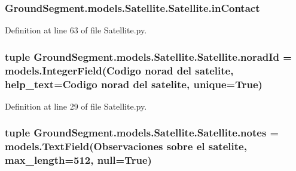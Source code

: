 \subsubsection[{in\+Contact}]{\setlength{\rightskip}{0pt plus 5cm}Ground\+Segment.\+models.\+Satellite.\+Satellite.\+in\+Contact}\label{class_ground_segment_1_1models_1_1_satellite_1_1_satellite_a5bb0cfae504099155343019582b87213}


Definition at line 63 of file Satellite.\+py.

\hypertarget{class_ground_segment_1_1models_1_1_satellite_1_1_satellite_a7962e5b81ff68f4fdedb33ce54bd4368}{}
\subsubsection[{norad\+Id}]{\setlength{\rightskip}{0pt plus 5cm}tuple Ground\+Segment.\+models.\+Satellite.\+Satellite.\+norad\+Id = models.\+Integer\+Field(\textquotesingle{}Codigo norad del satelite\textquotesingle{}, help\+\_\+text=\textquotesingle{}Codigo norad del satelite\textquotesingle{}, unique=True)\hspace{0.3cm}{\ttfamily [static]}}\label{class_ground_segment_1_1models_1_1_satellite_1_1_satellite_a7962e5b81ff68f4fdedb33ce54bd4368}


Definition at line 29 of file Satellite.\+py.

\hypertarget{class_ground_segment_1_1models_1_1_satellite_1_1_satellite_a6ae6b5fad6dd1a31200d8dd8e0ba07a0}{}
\subsubsection[{notes}]{\setlength{\rightskip}{0pt plus 5cm}tuple Ground\+Segment.\+models.\+Satellite.\+Satellite.\+notes = models.\+Text\+Field(\textquotesingle{}Observaciones sobre el satelite\textquotesingle{}, max\+\_\+length=512, null=True)\hspace{0.3cm}{\ttfamily [static]}}\label{class_ground_segment_1_1models_1_1_satellite_1_1_satellite_a6ae6b5fad6dd1a31200d8dd8e0ba07a0}


